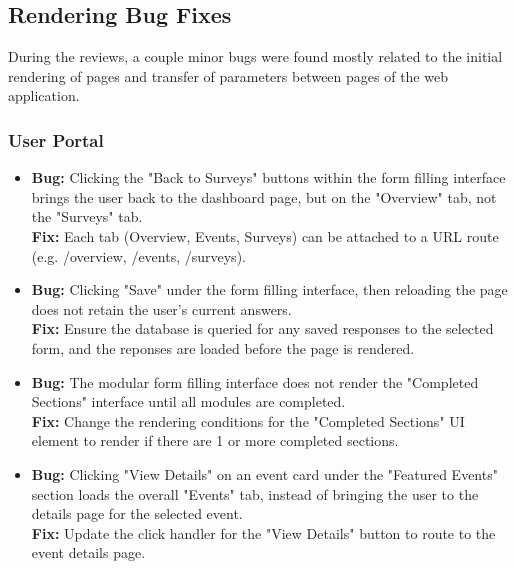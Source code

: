 \documentclass[12pt, titlepage]{article}
\begin{document}
\subsection{Rendering Bug Fixes}

During the reviews, a couple minor bugs were found mostly related to the initial rendering of pages and transfer of parameters between pages of the web application.

\subsubsection{User Portal}
\begin{itemize}
    \item
    \textbf{Bug:} Clicking the "Back to Surveys" buttons within the form filling interface brings the user back to the dashboard page, but on the "Overview" tab, not the "Surveys" tab.
    \\
    \textbf{Fix:} Each tab (Overview, Events, Surveys) can be attached to a URL route (e.g. /overview, /events, /surveys).
    \item
    \textbf{Bug:} Clicking "Save" under the form filling interface, then reloading the page does not retain the user's current answers.
    \\
    \textbf{Fix:} Ensure the database is queried for any saved responses to the selected form, and the reponses are loaded before the page is rendered.
    \item
    \textbf{Bug:} The modular form filling interface does not render the "Completed Sections" interface until all modules are completed.
    \\
    \textbf{Fix:} Change the rendering conditions for the "Completed Sections" UI element to render if there are 1 or more completed sections.
    \item
    \textbf{Bug:} Clicking "View Details" on an event card under the "Featured Events" section loads the overall "Events" tab, instead of bringing the user to the details page for the selected event.
    \\
    \textbf{Fix:} Update the click handler for the "View Details" button to route to the event details page.
\end{itemize}
\end{document}
